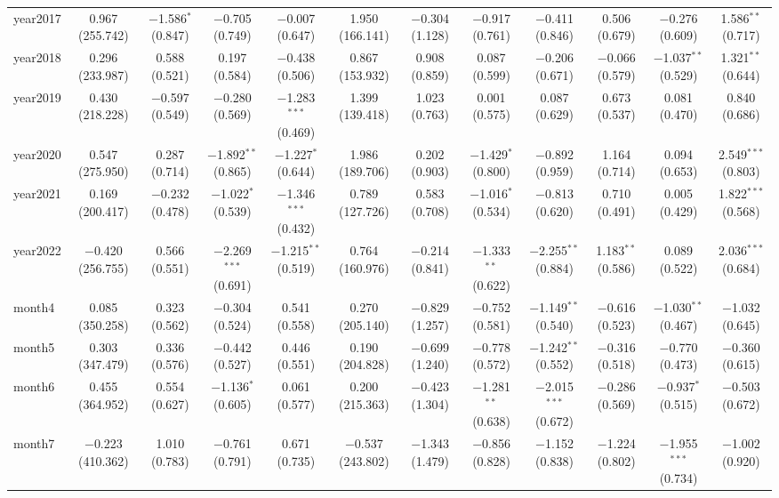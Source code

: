 \begin{table}[!htbp]
\begin{tabular}{@{\extracolsep{1pt}}lccccccccccc}
  year2017 & 0.967 (255.742) & $-$1.586$^{*}$ (0.847) & $-$0.705 (0.749) & $-$0.007 (0.647) & 1.950 (166.141) & $-$0.304 (1.128) & $-$0.917 (0.761) & $-$0.411 (0.846) & 0.506 (0.679) & $-$0.276 (0.609) & 1.586$^{**}$ (0.717) \\ 
  year2018 & 0.296 (233.987) & 0.588 (0.521) & 0.197 (0.584) & $-$0.438 (0.506) & 0.867 (153.932) & 0.908 (0.859) & 0.087 (0.599) & $-$0.206 (0.671) & $-$0.066 (0.579) & $-$1.037$^{**}$ (0.529) & 1.321$^{**}$ (0.644) \\ 
  year2019 & 0.430 (218.228) & $-$0.597 (0.549) & $-$0.280 (0.569) & $-$1.283$^{***}$ (0.469) & 1.399 (139.418) & 1.023 (0.763) & 0.001 (0.575) & 0.087 (0.629) & 0.673 (0.537) & 0.081 (0.470) & 0.840 (0.686) \\ 
  year2020 & 0.547 (275.950) & 0.287 (0.714) & $-$1.892$^{**}$ (0.865) & $-$1.227$^{*}$ (0.644) & 1.986 (189.706) & 0.202 (0.903) & $-$1.429$^{*}$ (0.800) & $-$0.892 (0.959) & 1.164 (0.714) & 0.094 (0.653) & 2.549$^{***}$ (0.803) \\ 
  year2021 & 0.169 (200.417) & $-$0.232 (0.478) & $-$1.022$^{*}$ (0.539) & $-$1.346$^{***}$ (0.432) & 0.789 (127.726) & 0.583 (0.708) & $-$1.016$^{*}$ (0.534) & $-$0.813 (0.620) & 0.710 (0.491) & 0.005 (0.429) & 1.822$^{***}$ (0.568) \\ 
  year2022 & $-$0.420 (256.755) & 0.566 (0.551) & $-$2.269$^{***}$ (0.691) & $-$1.215$^{**}$ (0.519) & 0.764 (160.976) & $-$0.214 (0.841) & $-$1.333$^{**}$ (0.622) & $-$2.255$^{**}$ (0.884) & 1.183$^{**}$ (0.586) & 0.089 (0.522) & 2.036$^{***}$ (0.684) \\ 
  month4 & 0.085 (350.258) & 0.323 (0.562) & $-$0.304 (0.524) & 0.541 (0.558) & 0.270 (205.140) & $-$0.829 (1.257) & $-$0.752 (0.581) & $-$1.149$^{**}$ (0.540) & $-$0.616 (0.523) & $-$1.030$^{**}$ (0.467) & $-$1.032 (0.645) \\ 
  month5 & 0.303 (347.479) & 0.336 (0.576) & $-$0.442 (0.527) & 0.446 (0.551) & 0.190 (204.828) & $-$0.699 (1.240) & $-$0.778 (0.572) & $-$1.242$^{**}$ (0.552) & $-$0.316 (0.518) & $-$0.770 (0.473) & $-$0.360 (0.615) \\ 
  month6 & 0.455 (364.952) & 0.554 (0.627) & $-$1.136$^{*}$ (0.605) & 0.061 (0.577) & 0.200 (215.363) & $-$0.423 (1.304) & $-$1.281$^{**}$ (0.638) & $-$2.015$^{***}$ (0.672) & $-$0.286 (0.569) & $-$0.937$^{*}$ (0.515) & $-$0.503 (0.672) \\ 
  month7 & $-$0.223 (410.362) & 1.010 (0.783) & $-$0.761 (0.791) & 0.671 (0.735) & $-$0.537 (243.802) & $-$1.343 (1.479) & $-$0.856 (0.828) & $-$1.152 (0.838) & $-$1.224 (0.802) & $-$1.955$^{***}$ (0.734) & $-$1.002 (0.920) \\ 

\end{tabular}
\end{table}
